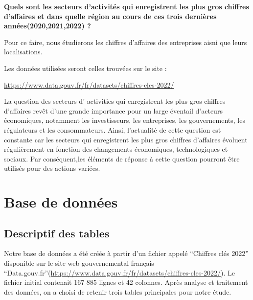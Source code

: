\documentclass[mstat,12pt]{unswthesis}
\begin{document}
\bigskip

\centering

\textbf{Quels sont les secteurs d'activités qui enregistrent les plus
gros chiffres d'affaires et dans quelle région au cours de ces trois
dernières années(2020,2021,2022) ? }

\justifying

\bigskip

Pour ce faire, nous étudierons les chiffres d'affaires des entreprises
aisni que leurs localisations.

Les données utilisées seront celles trouvées sur le site :

\url{https://www.data.gouv.fr/fr/datasets/chiffres-cles-2022/}

\medskip

La question des secteurs d' activities qui enregistrent les plus gros
chiffres d'affaires revêt d'une grande importance pour un large éventail
d'acteurs économiques, notamment les investisseurs, les entreprises, les
gouvernements, les régulateurs et les consommateurs. Ainsi, l'actualité
de cette question est constante car les secteurs qui enregistrent les
plus gros chiffres d'affaires évoluent régulièrement en fonction des
changements économiques, technologiques et sociaux. Par conséquent,les
éléments de réponse à cette question pourront être utilisés pour des
actions variées.

\medskip

\hypertarget{base-de-donnuxe9es}{%
\chapter{Base de données}\label{base-de-donnuxe9es}}

\hypertarget{descriptif-des-tables}{%
\section{Descriptif des tables}\label{descriptif-des-tables}}

Notre base de données a été créée à partir d'un fichier appelé
``Chiffres clés 2022'' disponible sur le site web gouvernemental
français
``Data.gouv.fr''(\url{https://www.data.gouv.fr/fr/datasets/chiffres-cles-2022/}).
Le fichier initial contenait 167 885 lignes et 42 colonnes. Après
analyse et traitement des données, on a choisi de retenir trois tables
principales pour notre étude.
\end{document}
